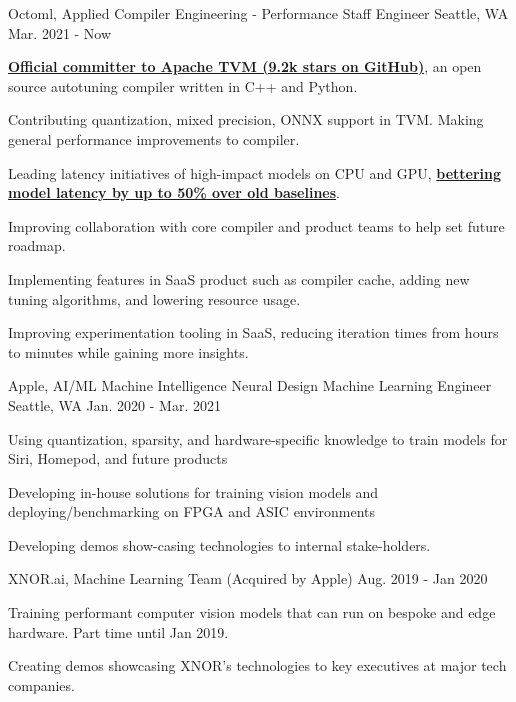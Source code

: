 \begin{cventries}
    \vspace{-0.6em}
  \cventry
    {Octoml, Applied Compiler Engineering - Performance}
    {Staff Engineer}
    {Seattle, WA}
    {Mar. 2021 - Now}
    {
      \begin{cvitems}
        \item {\underline{\textbf{Official committer to Apache TVM (9.2k stars on GitHub)}}, an open source autotuning compiler written in C++ and Python.}
		\item {Contributing quantization, mixed precision, ONNX support in TVM. Making general performance improvements to compiler.}
		\item {Leading latency initiatives of high-impact models on CPU and GPU, \underline{\textbf{bettering model latency by up to 50\% over old baselines}}.}
		\item {Improving collaboration with core compiler and product teams to help set future roadmap.}
		\item {Implementing features in SaaS product such as compiler cache, adding new tuning algorithms, and lowering resource usage.}
		\item {Improving experimentation tooling in SaaS, reducing iteration times from hours to minutes while gaining more insights.}
	\vspace{-1em}
      \end{cvitems}
    }


  \cventry
    {Apple, AI/ML Machine Intelligence Neural Design}
    {Machine Learning Engineer}
    {Seattle, WA}
    {Jan. 2020 - Mar. 2021}
    {
      \begin{cvitems}
        \item {Using quantization, sparsity, and hardware-specific knowledge to train models for Siri, Homepod, and future products}
        \item {Developing in-house solutions for training vision models and deploying/benchmarking on FPGA and ASIC environments}
		\item {Developing demos show-casing technologies to internal stake-holders.}
	\vspace{-1em}
      \end{cvitems}
    }

  \vspace{-0.4em}
  \cventry
    {XNOR.ai, Machine Learning Team (Acquired by Apple)}
    {}
    {}
    {Aug. 2019 - Jan 2020}
    {
      \begin{cvitems}
        \item {Training performant computer vision models that can run on bespoke and edge hardware. Part time until Jan 2019.}
        \item {Creating demos showcasing XNOR's technologies to key executives at major tech companies}. 
	\vspace{-1em}
      \end{cvitems}
    }


\end{cventries}

